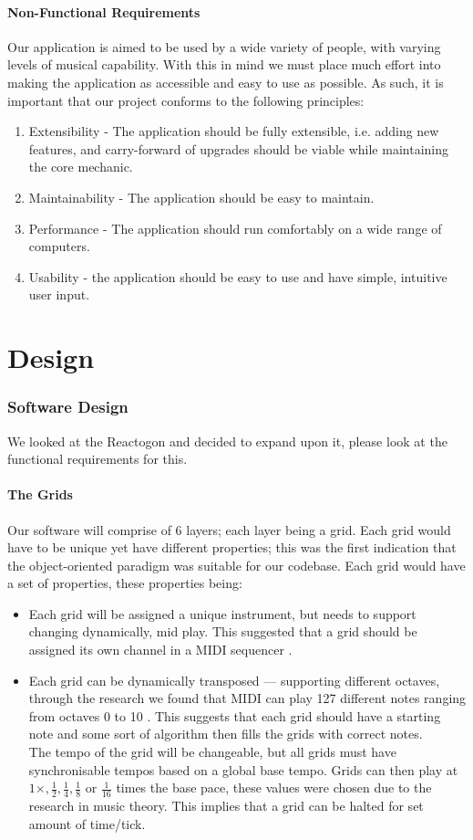 \documentclass[10pt,a4paper]{article}
\begin{document}
\subsection{Non-Functional Requirements}
Our application is aimed to be used by a wide variety of people, with varying levels of musical capability. With this in mind we must place much effort into making the application as accessible and easy to use as possible. As such, it is important that our project conforms to the following principles:

\begin{enumerate}
\item Extensibility - The application should be fully extensible, i.e. adding new features, and carry-forward of upgrades should be viable while maintaining the core mechanic.
\item Maintainability - The application should be easy to maintain.
\item Performance - The application should run comfortably on a wide range of computers.
\item Usability - the application should be easy to use and have simple, intuitive user input.
\end{enumerate}

\pagebreak
\part{Design}
\section{Software Design}
We looked at the Reactogon and decided to expand upon it, please look at the functional requirements for this.
\subsection{The Grids}
Our software will comprise of 6 layers; each layer being a grid. Each grid would have to be unique yet have different properties; this was the first indication that the object-oriented paradigm was suitable for our codebase. Each grid would have a set of properties, these properties being:
\begin{itemize}
\item Each grid will be assigned a unique instrument, but needs to support changing dynamically, mid play. This suggested that a grid should be assigned its own channel in a MIDI sequencer \cite{rees}.
\item Each grid can be dynamically transposed --- supporting different octaves, through the research we found that MIDI can play 127 different notes ranging from octaves 0 to 10 \cite{swift}. This suggests that each grid should have a starting note and some sort of algorithm then fills the grids with correct notes.\\
The tempo of the grid will be changeable, but all grids must have synchronisable tempos based on a global base tempo. Grids can then play at $ 1 \times , \frac{1}{2}, \frac{1}{4}, \frac{1}{8}$ or $\frac{1}{16} $ times the base pace, these values were chosen due to the research in music theory. This implies that a grid can be halted for set amount of time/tick.
\end{itemize}
\end{document}
